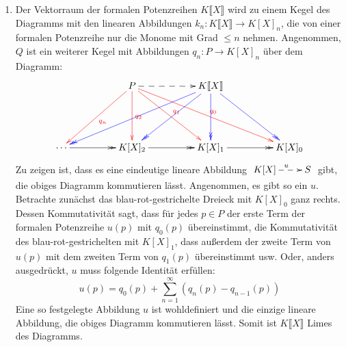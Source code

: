 \documentclass{pizzablatt}
\begin{document}
\begin{aufgabe}{}
\begin{enumerate}
\item Der Vektorraum der formalen Potenzreihen $K\llbracket X \rrbracket$ wird zu einem Kegel des Diagramms mit den linearen Abbildungen $k_n : K\llbracket X \rrbracket \to K[X]_{n}$, die von einer formalen Potenzreihe nur die Monome mit Grad $\leq n$ nehmen. Angenommen, $Q$ ist ein weiterer Kegel mit Abbildungen $q_n:P \to K[X]_{n}$ über dem Diagramm:
\[ \xymatrixcolsep{4pc}\xymatrixrowsep{4pc}\xymatrix {
  & P \ar@[red][ld]^{\textcolor{red}{q_{n}}} \ar@[red][d]^{\textcolor{red}{{q_{2}}}} \ar@[red][dr]^{\textcolor{red}{q_{1}}} \ar@[red][drr]^{\textcolor{red}{q_{0}}} \ar@{-->}[r]
  & K\llbracket X \rrbracket \ar@[blue]@{->>}[dll] \ar@[blue]@{->>}[dl] \ar@[blue]@{->>}[d] \ar@[blue]@{->>}[dr] \\
  \cdots \ar@{->>}[r] & K[X]_{2} \ar@{->>}[r] & K[X]_{1} \ar@{->>}[r] & K[X]_{0}
} \]
Zu zeigen ist, dass es eine eindeutige lineare Abbildung $\xymatrix{K[X] \ar@{-->}[r]^{u} & S}$ gibt, die obiges Diagramm kommutieren lässt. Angenommen, es gibt so ein $u$. Betrachte zunächst das blau-rot-gestrichelte Dreieck mit $K[X]_{0}$ ganz rechts. Dessen Kommutativität sagt, dass für jedes $p \in P$ der erste Term der formalen Potenzreihe $u(p)$ mit $q_{0}(p)$ übereinstimmt, die Kommutativität des blau-rot-gestrichelten mit $K[X]_{1}$, dass außerdem der zweite Term von $u(p)$ mit dem zweiten Term von $q_{1}(p)$ übereinstimmt usw. Oder, anders ausgedrückt, $u$ muss folgende Identität erfüllen:
\[ u(p) = q_{0}(p) + \sum_{n=1}^{\infty} \left(q_{n}(p) - q_{n-1}(p)\right) \]
Eine so festgelegte Abbildung $u$ ist wohldefiniert und die einzige lineare Abbildung, die obiges Diagramm kommutieren lässt. Somit ist $K\llbracket X \rrbracket$ Limes des Diagramms.
\end{enumerate}
\end{aufgabe}
\end{document}
